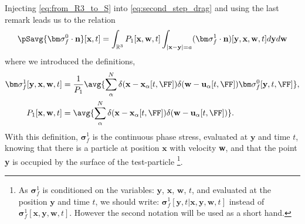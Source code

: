 Injecting \ref{eq:from_R3_to_S} into \ref{eq:second_step_drag} and using the last remark leads us to the relation 
\begin{equation}
    \pSavg{\bm\sigma_f^0\cdot\textbf{n}}[\textbf{x},t]
    =
    \int_{\mathbb{R}^3}
    P_1[\textbf{x},\textbf{w},t]
    \int_{|\textbf{x}-\textbf{y}|=a}
    (\bm\sigma_f^1 \cdot \textbf{n})[\textbf{y},\textbf{x},\textbf{w},t]
    d\textbf{y}
    d\textbf{w}
    \label{eq:conditionally_averaged}
\end{equation}
where we introduced the definitions, 
\begin{align}
    \bm\sigma^1_f[\textbf{y},\textbf{x},\textbf{w},t]
    &= 
    \frac{1}{P_1}
    \avg{
    \sum_\alpha^N 
    \delta(\textbf{x} - \textbf{x}_\alpha[t,\FF])
    \delta(\textbf{w} - \textbf{u}_\alpha[t,\FF])
    \bm\sigma_f^0[\textbf{y},t,\FF]
    },
    \label{eq:sigma_f_1}
    \\
    P_1[\textbf{x},\textbf{w},t]
    &= 
    \avg{
    \sum_\alpha^N 
    \delta(\textbf{x} - \textbf{x}_\alpha[t,\FF])
    \delta(\textbf{w} - \textbf{u}_\alpha[t,\FF])
    }. 
\end{align}
With this definition, $\bm\sigma^1_f$ is the continuous phase stress, evaluated at $\textbf{y}$ and time $t$, knowing that there is a particle at position $\textbf{x}$ with velocity \textbf{w}, and that the point \textbf{y} is occupied by the surface of the test-particle 
\footnote{
    As $\bm\sigma^1_f$ is conditioned on the variables: $\textbf{y}$, $\textbf{x}$, $\textbf{w}$, $t$, and evaluated at the position $\textbf{y}$ and time $t$, we should write: $\bm\sigma^1_f[\textbf{y},t|\textbf{x},\textbf{y},\textbf{w},t]$ instead of $\bm\sigma^1_f[\textbf{x},\textbf{y},\textbf{w},t]$.
    However the second notation will be used as a short hand. 
}.
